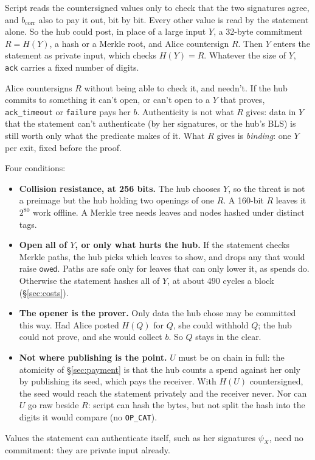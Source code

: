 \documentclass[11pt]{article}
\theoremstyle{plain}
\theoremstyle{definition}
\newcommand{\bcorr}{b_{\mathrm{corr}}}
\newcommand{\tx}[1]{\texttt{#1}}
\newcommand{\owed}{\mathsf{owed}}
\begin{document}
Script reads the countersigned values only to check that the two
signatures agree, and $\bcorr$ also to pay it out, bit by bit. Every
other value is read by the statement alone. So the hub could post, in
place of a large input $Y$, a 32-byte commitment $R = H(Y)$, a hash or
a Merkle root, and Alice countersign $R$. Then $Y$ enters the
statement as private input, which checks $H(Y) = R$. Whatever the
size of $Y$, \tx{ack} carries a fixed number of digits.

Alice countersigns $R$ without being able to check it, and needn't. If
the hub commits to something it can't open, or can't open to a $Y$
that proves, \tx{ack\_timeout} or \tx{failure} pays her $b$. Authenticity
is not what $R$ gives: data in $Y$ that the statement can't
authenticate (by her signatures, or the hub's BLS) is still worth only
what the predicate makes of it. What $R$ gives is \emph{binding}: one
$Y$ per exit, fixed before the proof.

Four conditions:
\begin{itemize}[nosep]
\item \textbf{Collision resistance, at 256 bits.} The hub chooses $Y$,
  so the threat is not a preimage but the hub holding two openings of
  one $R$. A 160-bit $R$ leaves it $2^{80}$ work offline. A Merkle tree
  needs leaves and nodes hashed under distinct tags.
\item \textbf{Open all of $Y$, or only what hurts the hub.} If the
  statement checks Merkle paths, the hub picks which leaves to show,
  and drops any that would raise $\owed$. Paths are safe only for
  leaves that can only lower it, as spends do. Otherwise the statement
  hashes all of $Y$, at about 490 cycles a block (\S\ref{sec:costs}).
\item \textbf{The opener is the prover.} Only data the hub chose may
  be committed this way. Had Alice posted $H(Q)$ for $Q$, she could
  withhold $Q$; the hub could not prove, and she would collect $b$.
  So $Q$ stays in the clear.
\item \textbf{Not where publishing is the point.} $U$ must be on chain
  in full: the atomicity of \S\ref{sec:payment} is that the hub counts a
  spend against her only by publishing its seed, which pays the
  receiver. With $H(U)$ countersigned, the seed would reach the
  statement privately and the receiver never. Nor can $U$ go raw beside
  $R$: script can hash the bytes, but not split the hash into the
  digits it would compare (no \texttt{OP\_CAT}).
\end{itemize}
Values the statement can authenticate itself, such as her signatures
$\psi_X$, need no commitment: they are private input already.
\end{document}
